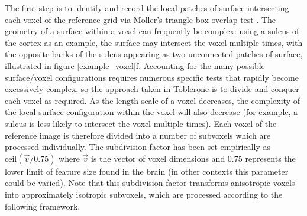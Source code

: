 The first step is to identify and record the local patches of surface intersecting each voxel of the reference grid via Moller’s triangle-box overlap test \cite{Akenine-Moller2001}. The geometry of a surface within a voxel can frequently be complex: using a sulcus of the cortex as an example, the surface may intersect the voxel multiple times, with the opposite banks of the sulcus appearing as two unconnected patches of surface, illustrated in figure \ref{example_voxel}f. Accounting for the many possible surface/voxel configurations requires numerous specific tests that rapidly become excessively complex, so the approach taken in Toblerone is to divide and conquer each voxel as required. As the length scale of a voxel decreases, the complexity of the local surface configuration within the voxel will also decrease (for example, a sulcus is less likely to intersect the voxel multiple times). Each voxel of the reference image is therefore divided into a number of subvoxels which are processed individually. The subdivision factor has been set empirically as $\mathrm{ceil}(\vec{v} / 0.75)$ where $\vec{v}$ is the vector of voxel dimensions and 0.75 represents the lower limit of feature size found in the brain (in other contexts this parameter could be varied). Note that this subdivision factor transforms anisotropic voxels into approximately isotropic subvoxels,  which are processed according to the following framework. 

